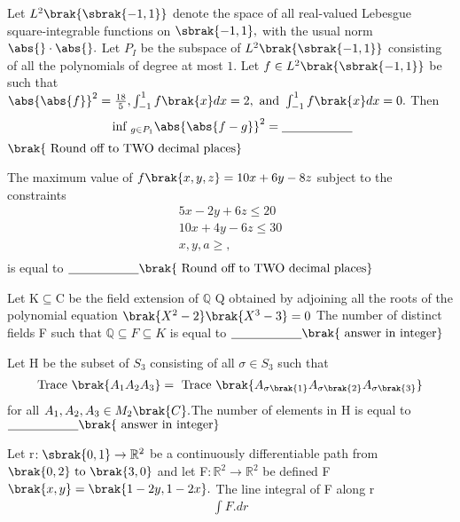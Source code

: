 \bigskip
\item Let $L^{2}\brak{\sbrak{-1,1}}$  denote the space of all real-valued Lebesgue square-integrable functions on $\sbrak{-1,1},$ with the usual norm $\abs{}\cdot\abs{}.$ Let $P_{I}$ be the subspace of $L^{2}\brak{\sbrak{-1,1}}$ consisting of all the polynomials of degree at most $1$. Let
$f\in L^{2}\brak{\sbrak{-1,1}}$ be such that $\abs{\abs{f}}^{2}=\frac{18}{5},\int_{-1}^{1}f\brak{x}dx=2,\text{ and }\int_{-1}^{1}f\brak{x}dx=0.$ Then 
\begin{align*}
    \text{ inf }_{g\in P_{1}}\abs{\abs{f-g}}^{2}= \underline{\hspace{2cm}}
\end{align*}
$\brak{\text{ Round off to TWO decimal places}}$
\bigskip
\item The maximum value of $f\brak{x,y,z}=10x+6y-8z$ subject to the constraints
\begin{align*}
    5x-2y+6z\leq 20\\10x+4y-6z\leq30\\x,y,a\geq,\\
\end{align*}
is equal to $\underline{\hspace{2cm}} \brak{\text{ Round off to TWO decimal places}}$
\bigskip
\item Let K$\subseteq$C be the field extension of $\mathbb{Q}$ Q obtained by adjoining all the roots of the polynomial equation $\brak{X^{2}-2}\brak{X^{3}-3}=0$ The number of distinct fields F such that $\mathbb{Q}\subseteq{F}\subseteq{K}$ is equal to $\underline{\hspace{2cm}} \brak{\text{ answer in integer}}$
\bigskip
\item Let H be the subset of $S_{3}$ consisting of all $\sigma\in S_{3}$ such that
\begin{align*}
    \text {Trace }\brak{A_{1}A_{2}A_{3}}=\text{ Trace }\brak{A_{\sigma\brak{1}}A_{\sigma\brak{2}}A_{\sigma\brak{3}}}
\end{align*}
for all $A_{1},A_{2},A_{3}\in M_{2}\brak{C}.$The number of elements in H is equal to $\underline{\hspace{2cm}} \brak{\text{ answer in integer}}$
\bigskip
\item Let r$:\sbrak{0,1}\to\mathbb{R}^{2}$ be a continuously differentiable path from $\brak{0,2}\text{ to }\brak{3,0}$ and let F$:\mathbb{R}^{2}\to\mathbb{R}^{2}$ be defined F$\brak{x,y}=\brak{1-2y,1-2x}.$ The line integral of F along r 
\begin{align*}
    \int F.dr
\end{align*}
